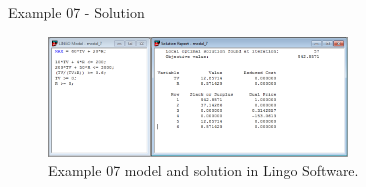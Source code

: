 \begin{frame}{Example 07 - Solution}
\begin{figure}
    \includegraphics[width=300px]{slides/ex07/screenshot.png}
    \caption{Example 07 model and solution in Lingo Software.}
\end{figure}
\end{frame}
